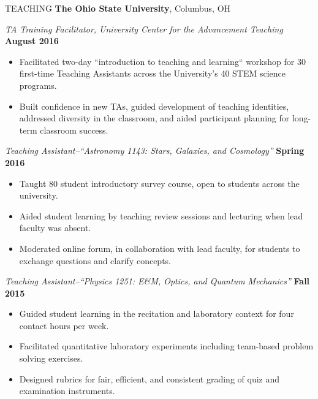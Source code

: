 \documentclass{resume} %
\begin{document}
\begin{rSection}{TEACHING}
{\bf The Ohio State University}, Columbus, OH 

{\em TA Training Facilitator, University Center for the Advancement Teaching} \hfill {\bf August 2016}
\begin{itemize}
\vspace*{-.05in}
\item Facilitated two-day ``introduction to teaching and learning`` workshop for 30 first-time Teaching Assistants across the University's 40 STEM science programs.
\item Built confidence in new TAs, guided development of teaching identities, addressed diversity in the classroom, and aided participant planning for long-term classroom success.
\end{itemize}
{\em Teaching Assistant--``Astronomy 1143: Stars, Galaxies, and Cosmology''} \hfill {\bf Spring 2016}
\begin{itemize}
\vspace*{-.05in}
\item Taught 80 student introductory survey course, open to students across the university.
\item Aided student learning by teaching review sessions and lecturing when lead faculty was absent.
\item Moderated online forum, in collaboration with lead faculty, for students to exchange questions and clarify concepts.
\end{itemize}
{\em Teaching Assistant--``Physics 1251: E\&M, Optics, and Quantum Mechanics''} \hfill {\bf Fall 2015}
\begin{itemize}
\vspace*{-.05in}
\item Guided student learning in the recitation and laboratory context for four contact hours per week.
\item Facilitated quantitative laboratory experiments including team-based problem solving exercises.
\item Designed rubrics for fair, efficient, and consistent grading of quiz and examination instruments.
\end{itemize}
\end{rSection}
\end{document}
